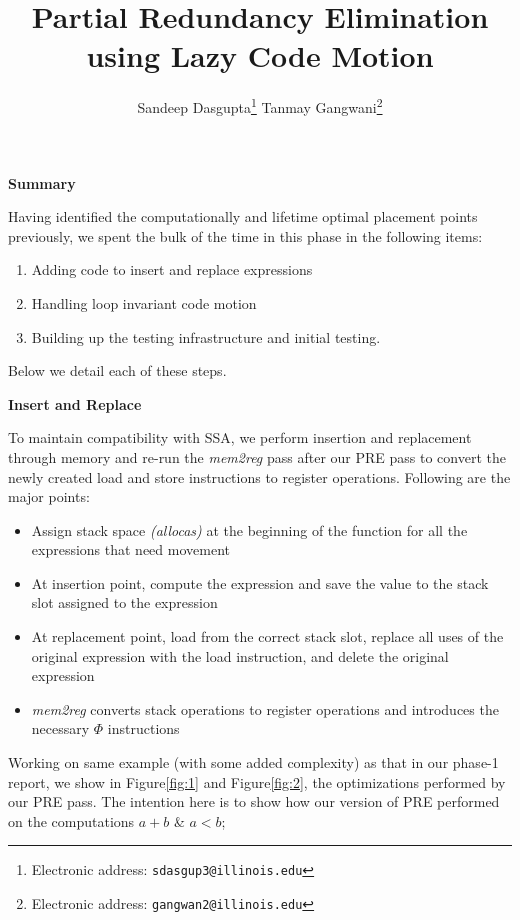 \documentclass[10pt,twoside]{report}
\title{\textbf{Partial Redundancy Elimination using Lazy Code Motion}}
\author{Sandeep Dasgupta\thanks{Electronic address:
\texttt{sdasgup3@illinois.edu}} \qquad Tanmay Gangwani\thanks{Electronic
address: \texttt{gangwan2@illinois.edu}}}
\begin{document}
\begin{titlepage}
\thispagestyle{empty}
\maketitle
\pagebreak
\end{titlepage}

\begin{flushleft}
\textbf{\Large{Summary}}
\end{flushleft}

Having identified the computationally and lifetime optimal placement points
  previously, we spent the bulk of the time in this phase in the following items:
  \begin{enumerate}
    \item Adding code to insert and replace expressions 
    \item Handling loop invariant code motion 
    \item Building up the testing infrastructure and initial testing. 
   \end{enumerate} 
Below we detail each of these steps.

\begin{flushleft}
\textbf{\Large{Insert and Replace}}
\end{flushleft}
To maintain compatibility with SSA, we perform insertion and replacement
  through memory and re-run the \emph{mem2reg} pass after our PRE pass to convert the
  newly created load and store instructions to register operations. Following
  are the major points:
\begin{itemize}  
  \item Assign stack space \emph{(allocas)} at the beginning of the
  function for all the expressions that need movement
  \item At insertion point,
           compute the expression and save the value to the stack slot assigned to the
             expression 
  \item At replacement point, load from the correct stack
             slot, replace all uses of the original expression with the load
             instruction, and delete the original expression
  \item \emph{mem2reg} converts stack operations to register operations and introduces the 
             necessary ${\Phi}$ instructions
\end{itemize}  

Working on same example (with some added complexity) as that in our phase-1 report, we show in Figure\ref{fig:1}
and Figure\ref{fig:2}, the optimizations performed by our PRE pass. The intention here is to
  show how our version of PRE performed on the computations $a + b$ \& $a < b$;
\end{document}

